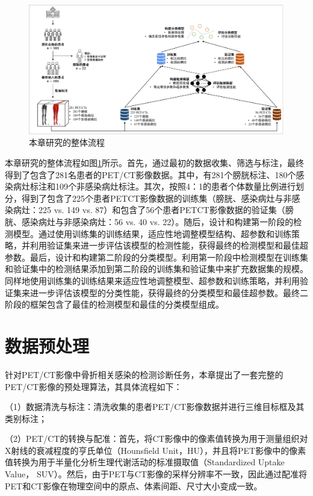 \begin{figure}[htbp]
    \centering
    \includegraphics[width=\textwidth]{figures/chap04_study.jpg}
    \caption{本章研究的整体流程}
    \label{fig:chap04_study}
\end{figure}

本章研究的整体流程如图\ref{fig:chap04_study}所示。首先，通过最初的数据收集、筛选与标注，最终得到了包含了281名患者的PET/CT影像数据。其中，有281个膀胱标注、180个感染病灶标注和109个非感染病灶标注。其次，按照4：1的患者个体数量比例进行划分，得到了包含了225个患者PETCT影像数据的训练集（膀胱、感染病灶与非感染病灶：225 vs. 149 vs. 87）和包含了56个患者PETCT影像数据的验证集（膀胱、感染病灶与非感染病灶：56 vs. 40 vs. 22）。随后，设计和构建第一阶段的检测模型。通过使用训练集的训练结果，适应性地调整模型结构、超参数和训练策略，并利用验证集来进一步评估该模型的检测性能，获得最终的检测模型和最佳超参数。最后，设计和构建第二阶段的分类模型。利用第一阶段中检测模型在训练集和验证集中的检测结果添加到第二阶段的训练集和验证集中来扩充数据集的规模。同样地使用训练集的训练结果来适应性地调整模型、超参数和训练策略，并利用验证集来进一步评估该模型的分类性能，获得最终的分类模型和最佳超参数。最终二阶段的框架包含了最佳的检测模型和最佳的分类模型组成。

\section{数据预处理}

针对PET/CT影像中骨折相关感染的检测诊断任务，本章提出了一套完整的PET/CT影像的预处理算法，其具体流程如下：

（1）数据清洗与标注：清洗收集的患者PET/CT影像数据并进行三维目标框及其类别标注；

（2）PET/CT的转换与配准：首先，将CT影像中的像素值转换为用于测量组织对X射线的衰减程度的亨氏单位（Hounsfield Unit，HU），并且将PET影像中的像素值转换为用于半量化分析生理代谢活动的标准摄取值（Standardized Uptake Value， SUV）。然后，由于PET与CT影像的采样分辨率不一致，因此通过配准将PET和CT影像在物理空间中的原点、体素间距、尺寸大小变成一致。

